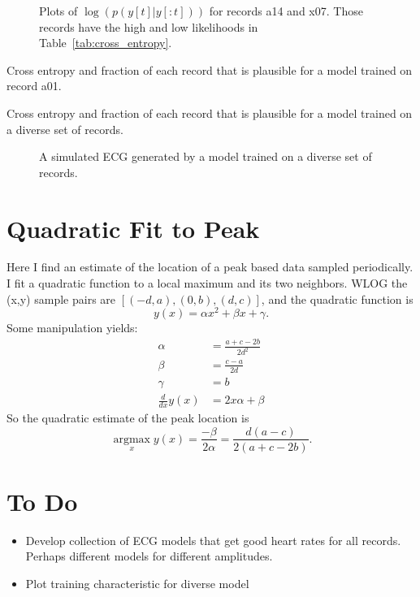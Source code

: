 \documentclass[12pt]{article}
\newcommand{\argmax}{\operatorname*{argmax}}
\begin{document}
\begin{figure}
  \centering
  \caption{Plots of $\log\left(p(y[t]|y[:t]) \right)$ for records a14
    and x07.  Those records have the high and low likelihoods in
    Table~\ref{tab:cross_entropy}.}
  \label{fig:likelihood}
\end{figure}

\begin{table}
  \centering
    
  \caption[Cross Entropy]{Cross entropy and fraction of each record
    that is plausible for a model trained on record a01.}
  \label{tab:cross_entropy}
\end{table}

\begin{table}
  \centering
    
  \caption[Cross Entropy]{Cross entropy and fraction of each record
    that is plausible for a model trained on a diverse set of records.}
  \label{tab:diverse_cross_entropy}
\end{table}

\begin{figure}
  \centering
  \caption{A simulated ECG generated by a model trained on a diverse
    set of records.}
  \label{fig:simulated}
\end{figure}

\section{Quadratic Fit to Peak}
\label{sec:quadratic}

Here I find an estimate of the location of a peak based data sampled
periodically.  I fit a quadratic function to a local maximum and its
two neighbors.  WLOG the (x,y) sample pairs are $[(-d,a), (0,b),
(d,c)]$, and the quadratic function is
\begin{equation*}
  y(x) = \alpha x^2 + \beta x + \gamma.
\end{equation*}
Some manipulation yields:
\begin{align*}
  \alpha &= \frac{a+c-2b}{2d^2} \\
  \beta &= \frac{c-a}{2d} \\
  \gamma &= b \\
  \frac{d}{dx} y(x) &= 2x\alpha + \beta
\end{align*}
So the quadratic estimate of the peak location is
\begin{equation*}
  \argmax_x y(x) = \frac{-\beta}{2\alpha} = \frac{d(a-c)}{2(a+c-2b)}.
\end{equation*}

\section{To Do}
\label{sec:todo}

\begin{itemize}
\item Develop collection of ECG models that get good heart rates for
  all records.  Perhaps different models for different amplitudes.
\item Plot training characteristic for diverse model
\end{itemize}
\end{document}
